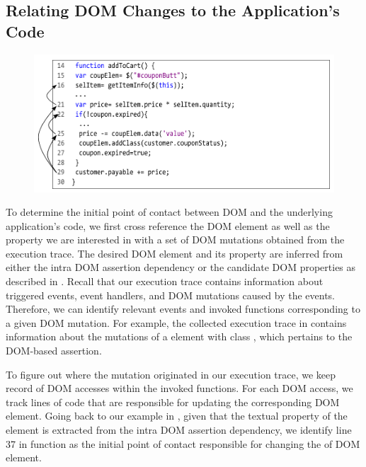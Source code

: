 \subsection{Relating DOM Changes to the Application's Code} \label{Sec:domToCode}
%
\begin{figure}[!t]
  \centering
  \includegraphics[width=1\hsize]{fig/intraCodeDep}
  \vspace{-0.2in} 
  \label{Fig:intraCodeDep}
\end{figure}
To determine the initial point of contact between DOM and the underlying application's code, we first cross reference the DOM element as well as the property we are interested in with a set of DOM mutations obtained from the execution trace. The desired DOM element and its property are inferred from either the intra DOM assertion dependency or the candidate DOM properties as described in . Recall that our execution trace contains information about triggered events, event handlers, and DOM mutations caused by the events. Therefore, we can identify relevant events and invoked functions corresponding to a given DOM mutation.
For example, the collected execution trace in  contains information about the mutations of a  element with class , which pertains to the DOM-based assertion.

To figure out where the mutation originated in our execution trace, we keep record of DOM accesses within the invoked functions. For each DOM access, we track \javascript lines of code that are responsible for updating the corresponding DOM element. Going back to our example in , given that the textual property of the  element is extracted from the intra DOM assertion dependency, we identify line 37 in function  as the initial point of contact responsible for changing the  of DOM element.


